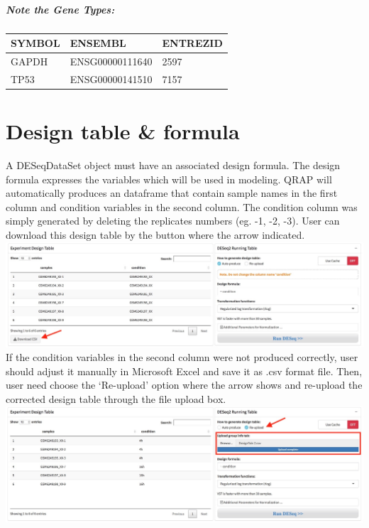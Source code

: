 \documentclass[
  a4paper,
  oneside]{book}
\begin{document}
\hypertarget{note-the-gene-types}{%
\subparagraph*{Note the Gene Types:}\label{note-the-gene-types}}

\begin{longtable}[]{@{}lll@{}}
\toprule()
SYMBOL & ENSEMBL & ENTREZID \\
\midrule()
\endhead
GAPDH & ENSG00000111640 & 2597 \\
TP53 & ENSG00000141510 & 7157 \\
\bottomrule()
\end{longtable}

\hypertarget{design-table-formula}{%
\section{Design table \& formula}\label{design-table-formula}}

A DESeqDataSet object must have an associated design formula. The design formula expresses the variables which will be used in modeling. QRAP will automatically produces an dataframe that contain sample names in the first column and condition variables in the second column. The condition column was simply generated by deleting the replicates numbers (eg. -1, -2, -3). User can download this design table by the button where the arrow indicated.
\includegraphics{images/design_table-auto.jpeg}
If the condition variables in the second column were not produced correctly, user should adjust it manually in Microsoft Excel and save it as .csv format file. Then, user need choose the `Re-upload' option where the arrow shows and re-upload the corrected design table through the file upload box.
\includegraphics{images/design_table-reupload.jpeg}
\end{document}
